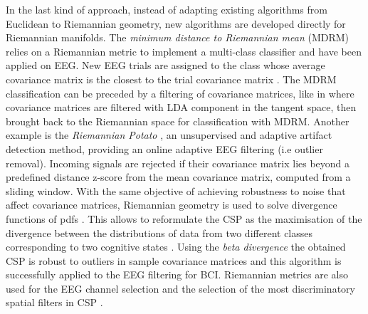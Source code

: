   
In the last kind of approach, instead of adapting existing algorithms from Euclidean to Riemannian geometry, new algorithms are developed directly for Riemannian manifolds.
The \emph{minimum distance to Riemannian mean} (MDRM) relies on a Riemannian metric to implement a multi-class classifier and have been applied on EEG.
New EEG trials are assigned to the class whose average covariance matrix is the closest to the trial covariance matrix \citep{barachant_multiclass_2012}.
The MDRM classification can be preceded by a filtering of covariance matrices, like in \citep{barachant_riemannian_2010} where covariance matrices are filtered with LDA component in the tangent space, then brought back to the Riemannian space for classification with MDRM. 
Another example is the \emph{Riemannian Potato} \citep{barachant_riemannian_2013}, an unsupervised and adaptive artifact detection method, providing an online adaptive EEG filtering (i.e outlier removal). 
Incoming signals are rejected if their covariance matrix lies beyond a predefined distance z-score from the mean covariance matrix, computed from a sliding window.
With the same objective of achieving robustness to noise that affect covariance matrices, Riemannian geometry is used to solve divergence functions of pdfs \citep{amari_information_2010}.
This allows to reformulate the CSP as the maximisation of the divergence between the distributions of data from two different classes corresponding to two cognitive states \citep{samek_robust_2013,samek_information_2014}. 
Using the \emph{beta divergence} the obtained CSP is robust to outliers in sample covariance matrices and this algorithm is successfully applied to the EEG filtering for BCI.   
Riemannian metrics are also used for the EEG channel selection \citep{barachant_channel_2011} and the selection of the most discriminatory spatial filters in CSP \citep{barachant_common_2010}.  


